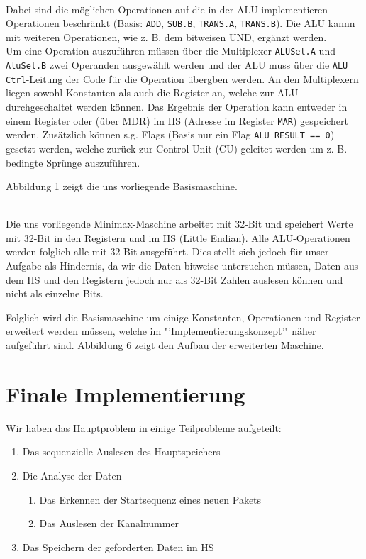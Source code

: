 \documentclass[12pt,titlepage]{article}
\begin{document}
\leavevmode \\

Dabei sind die m{\"o}glichen Operationen auf die in der ALU implementieren
Operationen beschr{\"a}nkt (Basis: \texttt{ADD}, \texttt{SUB.B}, \texttt{TRANS.A}, \texttt{TRANS.B}). Die ALU kannn mit weiteren Operationen,
wie z. B. dem bitweisen UND, erg{\"a}nzt werden.\\
Um eine Operation auszuf{\"u}hren m{\"u}ssen {\"u}ber die Multiplexer \texttt{ALUSel.A} und \texttt{AluSel.B} zwei Operanden ausgew{\"a}hlt werden
und der ALU muss {\"u}ber die \texttt{ALU Ctrl}-Leitung der Code f{\"u}r die Operation {\"u}bergben werden. An den Multiplexern liegen sowohl
Konstanten als auch die Register an, welche zur ALU durchgeschaltet werden k{\"o}nnen. Das Ergebnis der Operation kann
entweder in einem Register oder (über MDR) im HS (Adresse im Register \texttt{MAR}) gespeichert werden. Zus{\"a}tzlich k{\"o}nnen s.g. Flags (Basis nur ein Flag \texttt{ALU RESULT == 0})
gesetzt werden, welche zur{\"u}ck zur Control Unit (CU) geleitet werden um z. B. bedingte Spr{\"u}nge auszuf{\"u}hren.

Abbildung 1 zeigt die uns vorliegende Basismaschine.

\leavevmode \\

Die uns vorliegende Minimax-Maschine arbeitet mit 32-Bit und speichert Werte mit 32-Bit in den Registern und im HS (\dq Little Endian\dq ).
Alle ALU-Operationen werden folglich alle mit 32-Bit ausgef{\"u}hrt. Dies stellt sich jedoch f{\"u}r unser Aufgabe als
Hindernis, da wir die Daten bitweise untersuchen m{\"u}ssen, Daten aus dem HS und den Registern jedoch nur als
32-Bit Zahlen auslesen k{\"o}nnen und nicht als einzelne Bits.

Folglich wird die Basismaschine um einige Konstanten, Operationen und Register erweitert werden müssen, welche im "'Implementierungskonzept'" n{\"a}her
aufgeführt sind. Abbildung 6 zeigt den Aufbau der erweiterten Maschine.

\newpage

\section{Finale Implementierung}
Wir haben das Hauptproblem in einige Teilprobleme aufgeteilt:
\begin{enumerate}
\item Das sequenzielle Auslesen des Hauptspeichers
\item Die Analyse der Daten
    \begin{enumerate}
    \item Das Erkennen der Startsequenz eines neuen Pakets
    \item Das Auslesen der Kanalnummer
    \end{enumerate}
\item Das Speichern der geforderten Daten im HS
\end{enumerate}
\end{document}
